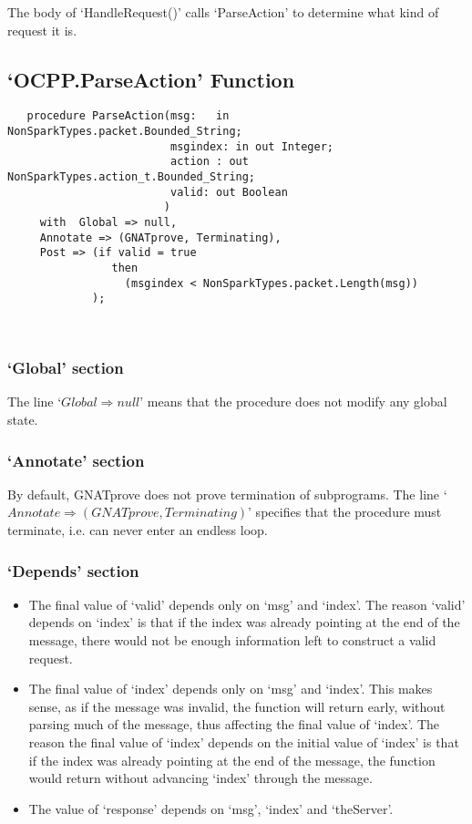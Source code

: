 \documentclass[12pt,openany,a4paper]{book}
\begin{document}
The body of `HandleRequest()' calls `ParseAction' to determine what kind of request it is.

\subsection{`OCPP.ParseAction' Function}
\begin{verbatim}
   procedure ParseAction(msg:   in  NonSparkTypes.packet.Bounded_String;
                         msgindex: in out Integer;
                         action : out NonSparkTypes.action_t.Bounded_String;
                         valid: out Boolean
                        )
     with  Global => null,
     Annotate => (GNATprove, Terminating),
     Post => (if valid = true 
                then 
                  (msgindex < NonSparkTypes.packet.Length(msg))
             );

   
\end{verbatim}
\subsubsection{`Global' section}
The line `$Global \Rightarrow null$' means that the procedure does not modify any global state.
\subsubsection{`Annotate' section}
By default, GNATprove does not prove termination of subprograms. The line `$Annotate \Rightarrow (GNATprove, Terminating)$' specifies that the procedure must terminate, i.e. can never enter an endless loop. 
\subsubsection{`Depends' section}
\begin{itemize}
\item The final value of `valid' depends only on `msg' and `index'. The reason `valid' depends on `index' is that if the index was already pointing at the end of the message, there would not be enough information left to construct a valid request.
\item The final value of `index' depends only on `msg' and `index'. This makes sense, as if the message was invalid, the function will return early, without parsing much of the message, thus affecting the final value of `index'. The reason the final value of `index' depends on the initial value of `index' is that if the index was already pointing at the end of the message, the function would return without advancing `index' through the message.
\item The value of `response' depends on `msg', `index' and `theServer'. 
\end{itemize}
\end{document}
